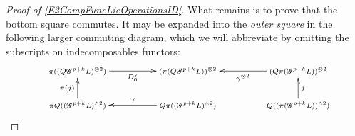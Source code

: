 \documentclass[11pt]{amsart}
\theoremstyle{plain}
\theoremstyle{definition}
\newcommand{\scrG}{\mathscr{G}}
\newcommand{\calW}{\mathcal{W}}
\theoremstyle{plain}
\newcommand{\BSW}{{\scrG}}
\begin{document}
\begin{Operations in composite functor spectral sequences}
\begin{proof}[Proof of \ref{E2CompFuncLieOperationsID}]
What remains is to prove that the bottom square commutes. It may be expanded into the \emph{outer square} in the following larger commuting diagram, which we will abbreviate by omitting the subscripts on indecomposables functors:
\[
\def\objectstyle{\scriptstyle}
\xymatrix@R=6mm@C=13mm@!0{
&%
\pi((Q\BSW^{p+k}L)^{\otimes2}) \ar[rrr]_-{D_0^{\textup{v}}}
&%
&%
&%
(\pi (Q\BSW^{p+k}L))^{\otimes2}&%
&%
&%
(Q\pi(\BSW^{p+k}L))^{\otimes2} \ar[lll]^-{\gamma^{\otimes2}}\\\\%
&%
\pi Q((\BSW^{p+k}L)^{\wedge 2})\ar[uu]^-{\pi(j)}
&%
&%
&%
Q\pi((\BSW^{p+k}L)^{\wedge 2})\ar[lll]_-{\gamma}
&%
&%
&%
Q((\pi( \BSW^{p+k}L))^{\wedge 2})
\ar[uu]_-{j}
}\]
\end{proof}
\end{Operations in composite functor spectral sequences}
\end{document}

